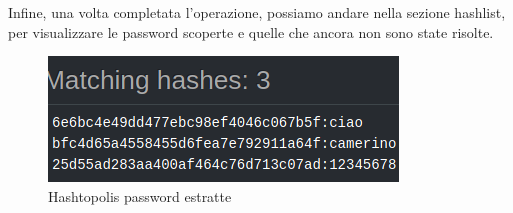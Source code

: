 Infine, una volta completata l'operazione, possiamo andare nella sezione hashlist, per visualizzare le password scoperte e quelle che ancora non sono state risolte.

\begin{figure}[ht]
    \centering
    \includegraphics[width=\linewidth]{Immagini/8/hashtopolis_10.png}
    \caption{Hashtopolis password estratte}
\end{figure}

\label{chap:conc}